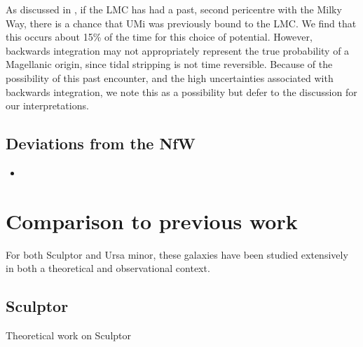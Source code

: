 As discussed in \citet{vasiliev2024}, if the LMC has had a past, second
pericentre with the Milky Way, there is a chance that UMi was previously
bound to the LMC. We find that this occurs about 15\% of the time for
this choice of potential. However, backwards integration may not
appropriately represent the true probability of a Magellanic origin,
since tidal stripping is not time reversible. Because of the possibility
of this past encounter, and the high uncertainties associated with
backwards integration, we note this as a possibility but defer to the
discussion for our interpretations.

\subsection{Deviations from the NfW}\label{deviations-from-the-nfw}

\begin{itemize}
\tightlist
\item
  \citet{dicintio+2013}
\end{itemize}

\section{Comparison to previous work}\label{comparison-to-previous-work}

For both Sculptor and Ursa minor, these galaxies have been studied
extensively in both a theoretical and observational context.

\subsection{Sculptor}\label{sculptor}

Theoretical work on Sculptor

